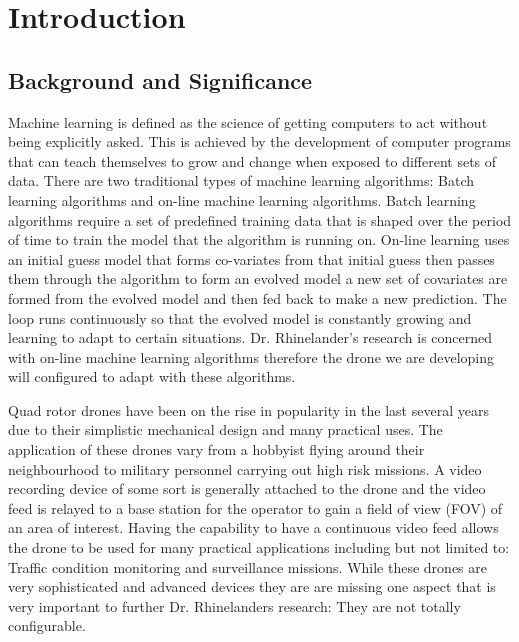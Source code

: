 
\section{Introduction}

\subsection{Background and Significance}


Machine learning is defined as the science of getting computers to act without being explicitly asked. This is achieved by the development of computer programs that can teach themselves to grow and change when exposed to different sets of data. There are two traditional types of machine learning algorithms: Batch learning algorithms and on-line machine learning algorithms. Batch learning algorithms require a set of predefined training data that is shaped over the period of time to train the model that the algorithm is running on. On-line learning uses an initial guess model that forms co-variates from that initial guess then passes them through the algorithm to form an evolved model a new set of covariates are formed from the evolved model and then fed back to make a new prediction. The loop runs continuously so that the evolved model is constantly growing and learning to adapt to certain situations. Dr. Rhinelander's research is concerned with on-line machine learning algorithms therefore the drone we are developing will configured to adapt with these algorithms. 

Quad rotor drones have been on the rise in popularity in the last several years due to their simplistic mechanical design and many practical uses. The application of these drones vary from a hobbyist flying around their neighbourhood to military personnel carrying out high risk missions. A video recording device of some sort is generally attached to the drone and the video feed is relayed to a base station for the operator to gain a field of view (FOV) of an area of interest. Having the capability to have a continuous video feed allows the drone to be used for many practical applications including but not limited to: Traffic condition monitoring and surveillance missions. While these drones are very sophisticated and advanced devices they are are missing one aspect that is very important to further Dr. Rhinelanders research: They are not totally configurable. 

